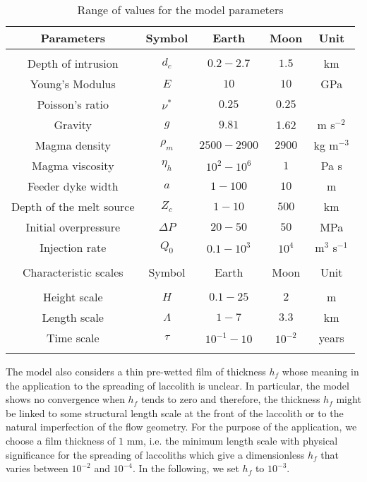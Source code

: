 \begin{table}[h!]
  \caption{Range of values for the model parameters}
  \centering
  \begin{tabular}{c|c|c|c|c}
    Parameters& Symbol & Earth & Moon&Unit\\
    \hline
              &&&&\\
    Depth of intrusion & $d_c$ & $0.2-2.7$ &$1.5$ &km \\
    Young's Modulus & $E$ & $10$ &$10$ &GPa \\
    Poisson's ratio & $\nu^*$ & $0.25$ &$0.25$ &\\
    Gravity & $g$ & $9.81$ &1.62&m s$^{-2}$ \\
    Magma density & $\rho_{m}$ & $2500-2900$ &$2900$&kg m$^{-3}$ \\
    Magma viscosity & $\eta_h $ & $10^2-10^{6}$ &$1$&Pa s \\
    Feeder dyke width & $a$ & $1-100$ &$10$&m \\
    Depth of the melt source & $Z_{c}$ & $ 1-10$&$ 500$& km \\ 
    Initial overpressure & $\Delta P$ & $20-50$ &$50$ &MPa \\
    Injection rate & $Q_{0}$ &$0.1-10^3$ &$10^4$&m$^{3}$ s$^{-1}$ \\
              &&&&\\
    \hline
    Characteristic scales & Symbol & Earth & Moon&Unit\\
    \hline
              &&&&\\
    Height scale & $H$& $0.1-25$ &$2$ &m \\
    Length scale & $\Lambda$ & $1-7$&$3.3$& km \\
    Time scale & $\tau$ & $10^{-1}-10$&$10^{-2}$& years \\
    \label{C2-tab2}
  \end{tabular} 
\end{table}

The model  also considers  a thin pre-wetted  film of  thickness $h_f$
whose  meaning in  the application  to the  spreading of  laccolith is
unclear.  In  particular, the  model shows  no convergence  when $h_f$
tends to zero \citep{Lister:2013ia} and therefore, the thickness $h_f$
might be  linked to some structural  length scale at the  front of the
laccolith or  to the natural  imperfection of the flow  geometry.  For
the purpose of the application, we  choose a film thickness of $1$ mm,
i.e.   the minimum  length scale  with physical  significance for  the
spreading of laccoliths  which give a dimensionless  $h_f$ that varies
between $10^{-2}$  and $10^{-4}$.  In  the following, we set  $h_f$ to
$10^{-3}$.

